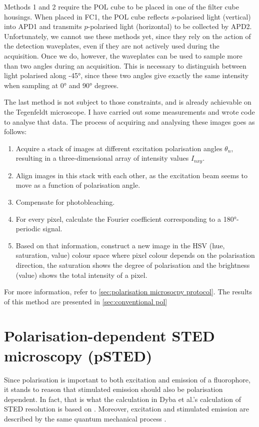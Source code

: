 Methods 1 and 2 require the POL cube to be placed in one of the filter cube housings. When placed in FC1, the POL cube reflects $ s $-polarised light (vertical) into APD1 and transmits $ p $-polarised light (horizontal) to be collected by APD2. Unfortunately, we cannot use these methods yet, since they rely on the action of the detection waveplates, even if they are not actively used during the acquisition. Once we do, however, the waveplates can be used to sample more than two angles during an acquisition. This is necessary to distinguish between light polarised along \ang{+-45}, since these two angles give exactly the same intensity when sampling at \ang{0} and \ang{90} degrees.

The last method is not subject to those constraints, and is already achievable on the Tegenfeldt microscope. I have carried out some measurements and wrote code to analyse that data. The process of acquiring and analysing these images goes as follows:
\begin{enumerate}
	\item Acquire a stack of images at different excitation polarisation angles $ \theta_n $, resulting in a three-dimensional array of intensity values $ I_{nxy} $.
	\item Align images in this stack with each other, as the excitation beam seems to move as a function of polarisation angle.
	\item Compensate for photobleaching.
	\item For every pixel, calculate the Fourier coefficient corresponding to a \ang{180}-periodic signal.
	\item Based on that information, construct a new image in the HSV (hue, saturation, value) colour space where pixel colour depends on the polarisation direction, the saturation shows the degree of polarisation and the brightness (value) shows the total intensity of a pixel. 

\end{enumerate}

For more information, refer to \autoref{sec:polarisation microsocpy protocol}. The results of this method are presented in \autoref{sec:conventional pol}

\section{Polarisation-dependent STED microscopy (pSTED)}
\label{sec:psted theory}

Since polarisation is important to both excitation and emission of a fluorophore, it stands to reason that stimulated emission should also be polarisation dependent. In fact, that is what the calculation in Dyba et al.'s calculation of STED resolution is based on \cite{Harke2008, Dyba2005}. Moreover, excitation and stimulated emission are described by the same quantum mechanical process \cite{Foot}.

